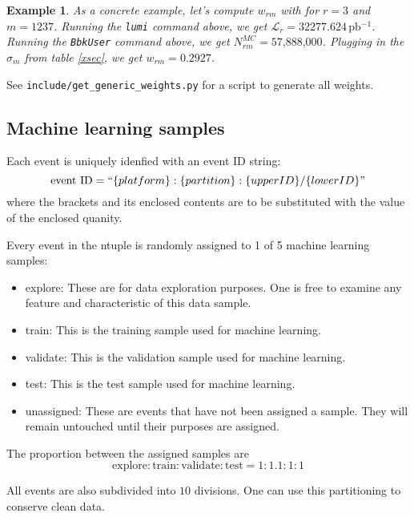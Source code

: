 \documentclass{article}
\renewcommand{\(}{\left(}
\renewcommand{\)}{\right)}
\newtheorem{example}[theorem]{Example}
\numberwithin{equation}{section}
\begin{document}
\begin{example}
  As a concrete example, let's compute $w_{rm}$ with for $r=3$ and $m=1237$. Running the \verb!lumi! command above, we get $\mathcal{L}_r=32277.624\,\text{pb$^{-1}$}$. Running the \verb!BbkUser! command above, we get $N^{MC}_{rm}=\text{57,888,000}$. Plugging in the $\sigma_m$ from table \ref{xsec}, we get $w_{rm}=0.2927$.
\end{example}

See \verb!include/get_generic_weights.py! for a script to generate all weights. 

\subsection{Machine learning samples}
Each event is uniquely idenfied with an event ID string:
\begin{equation}
  \text{event ID} = ``\{platform\}:\{partition\}:\{upperID\}/\{lowerID\}"
\end{equation}
where the brackets and its enclosed contents are to be substituted with the value of the enclosed quanity.

Every event in the ntuple is randomly assigned to 1 of 5 machine learning samples:
\begin{itemize}
  \item explore: These are for data exploration purposes. One is free to examine any feature and characteristic of this data sample. 
  \item train: This is the training sample used for machine learning. 
  \item validate: This is the validation sample used for machine learning. 
  \item test: This is the test sample used for machine learning. 
  \item unassigned: These are events that have not been assigned a sample. They will remain untouched until their purposes are assigned. 
\end{itemize}

The proportion between the assigned samples are 
\begin{equation}
  \text{explore}:\text{train}:\text{validate}:\text{test}= 1 : 1.1 : 1 : 1
\end{equation}

All events are also subdivided into $10$ divisions. One can use this partitioning to conserve clean data.
\end{document}
